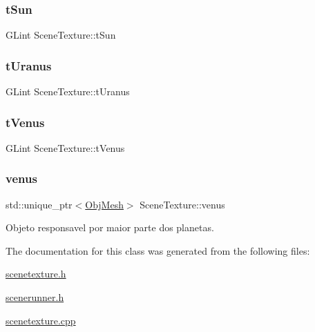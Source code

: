 \subsubsection{\texorpdfstring{tSun}{tSun}}
{\footnotesize\ttfamily G\+Lint Scene\+Texture\+::t\+Sun\hspace{0.3cm}{\ttfamily [private]}}

\mbox{\label{class_scene_texture_ae85f2fd16e84021ab9d020298af5dc30}} 
\subsubsection{\texorpdfstring{tUranus}{tUranus}}
{\footnotesize\ttfamily G\+Lint Scene\+Texture\+::t\+Uranus\hspace{0.3cm}{\ttfamily [private]}}

\mbox{\label{class_scene_texture_ac7404076871e4eccddae3486c0b127e4}} 
\subsubsection{\texorpdfstring{tVenus}{tVenus}}
{\footnotesize\ttfamily G\+Lint Scene\+Texture\+::t\+Venus\hspace{0.3cm}{\ttfamily [private]}}

\mbox{\label{class_scene_texture_a828f9a79b2003b21d0ce58f4960a608d}} 
\subsubsection{\texorpdfstring{venus}{venus}}
{\footnotesize\ttfamily std\+::unique\+\_\+ptr$<$\mbox{\hyperlink{class_obj_mesh}{Obj\+Mesh}}$>$ Scene\+Texture\+::venus\hspace{0.3cm}{\ttfamily [private]}}



Objeto responsavel por maior parte dos planetas. 



The documentation for this class was generated from the following files\+:\begin{DoxyCompactItemize}
\item 
\mbox{\hyperlink{scenetexture_8h}{scenetexture.\+h}}\item 
\mbox{\hyperlink{scenerunner_8h}{scenerunner.\+h}}\item 
\mbox{\hyperlink{scenetexture_8cpp}{scenetexture.\+cpp}}\end{DoxyCompactItemize}
